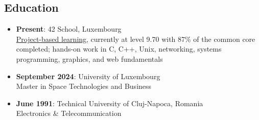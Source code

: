 \documentclass[a4paper,10pt]{article}
\begin{document}
\subsection*{Education}
\begin{itemize}
    \item \textbf{Present}: 42 School, Luxembourg\\
    \href{gotoe:embedded=references/42Transcript.pdf}{Project-based learning}, currently at level 9.70 with 87\% of the common core completed; hands-on work in C, C++, Unix, networking, systems programming, graphics, and web fundamentals
    \item \textbf{September 2024}: University of Luxembourg\\
    Master in Space Technologies and Business
    \item \textbf{June 1991}: Technical University of Cluj-Napoca, Romania\\
    Electronics \& Telecommunication
\end{itemize}
\end{document}
